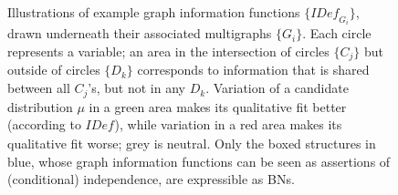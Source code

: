 \documentclass[letterpaper]{article} %
\theoremstyle{plain}
\theoremstyle{definition}
\theoremstyle{remark}
\newcounter{subfigure}
\renewcommand\thesubfigure{\thefigure(\alph{subfigure})}
\newcommand{\IDef}[1]{\mathit{IDef}_{\!#1}}
\begin{document}
{\begin{figure}
{
    }
    \addtocounter{figure}{-1} %
    \caption{
	Illustrations of example graph information
    	  functions $\{ \IDef{G_i} \}$, drawn underneath their
    	  associated multigraphs $\{ G_i\}$. Each circle represents a
    	  variable; an area in the intersection of circles $\{C_j\}$
    	  but outside of circles $\{D_k\}$ corresponds to information
    	  that is shared between all $C_j$'s, but not in any
    	  $D_k$. Variation of a candidate distribution $\mu$ in a
    	  green area makes its qualitative fit better (according to
    	  $\IDef{}$), while variation in a red area makes its
    	  qualitative fit worse; grey is neutral. Only the boxed
    	  structures in blue, whose graph information functions can be
    	  seen as assertions of (conditional) independence, are
    	  expressible as BNs.
		  } 

    \label{fig:info-diagram}
    \end{figure}
}%
\fi
\end{document}
